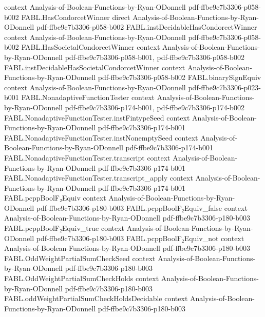 \begin{theorem}
  {context}
  {Analysis-of-Boolean-Functions-by-Ryan-ODonnell}
  {pdf-ffbe9c7b3306-p058-b002}
\proofstep
  {FABL.HasCondorcetWinner}
  {direct}
  {Analysis-of-Boolean-Functions-by-Ryan-ODonnell}
  {pdf-ffbe9c7b3306-p058-b002}
\proofstep
  {FABL.instDecidableHasCondorcetWinner}
  {context}
  {Analysis-of-Boolean-Functions-by-Ryan-ODonnell}
  {pdf-ffbe9c7b3306-p058-b002}
\proofstep
  {FABL.HasSocietalCondorcetWinner}
  {context}
  {Analysis-of-Boolean-Functions-by-Ryan-ODonnell}
  {pdf-ffbe9c7b3306-p058-b001,
    pdf-ffbe9c7b3306-p058-b002}
\proofstep
  {FABL.instDecidableHasSocietalCondorcetWinner}
  {context}
  {Analysis-of-Boolean-Functions-by-Ryan-ODonnell}
  {pdf-ffbe9c7b3306-p058-b002}
\proofstep
  {FABL.binarySignEquiv}
  {context}
  {Analysis-of-Boolean-Functions-by-Ryan-ODonnell}
  {pdf-ffbe9c7b3306-p023-b001}
\proofstep
  {FABL.NonadaptiveFunctionTester}
  {context}
  {Analysis-of-Boolean-Functions-by-Ryan-ODonnell}
  {pdf-ffbe9c7b3306-p174-b001,
    pdf-ffbe9c7b3306-p174-b002}
\proofstep
  {FABL.NonadaptiveFunctionTester.instFintypeSeed}
  {context}
  {Analysis-of-Boolean-Functions-by-Ryan-ODonnell}
  {pdf-ffbe9c7b3306-p174-b001}
\proofstep
  {FABL.NonadaptiveFunctionTester.instNonemptySeed}
  {context}
  {Analysis-of-Boolean-Functions-by-Ryan-ODonnell}
  {pdf-ffbe9c7b3306-p174-b001}
\proofstep
  {FABL.NonadaptiveFunctionTester.transcript}
  {context}
  {Analysis-of-Boolean-Functions-by-Ryan-ODonnell}
  {pdf-ffbe9c7b3306-p174-b001}
\proofstep
  {FABL.NonadaptiveFunctionTester.transcript_apply}
  {context}
  {Analysis-of-Boolean-Functions-by-Ryan-ODonnell}
  {pdf-ffbe9c7b3306-p174-b001}
\proofstep
  {FABL.pcppBoolF₂Equiv}
  {context}
  {Analysis-of-Boolean-Functions-by-Ryan-ODonnell}
  {pdf-ffbe9c7b3306-p180-b003}
\proofstep
  {FABL.pcppBoolF₂Equiv_false}
  {context}
  {Analysis-of-Boolean-Functions-by-Ryan-ODonnell}
  {pdf-ffbe9c7b3306-p180-b003}
\proofstep
  {FABL.pcppBoolF₂Equiv_true}
  {context}
  {Analysis-of-Boolean-Functions-by-Ryan-ODonnell}
  {pdf-ffbe9c7b3306-p180-b003}
\proofstep
  {FABL.pcppBoolF₂Equiv_not}
  {context}
  {Analysis-of-Boolean-Functions-by-Ryan-ODonnell}
  {pdf-ffbe9c7b3306-p180-b003}
\proofstep
  {FABL.OddWeightPartialSumCheckSeed}
  {context}
  {Analysis-of-Boolean-Functions-by-Ryan-ODonnell}
  {pdf-ffbe9c7b3306-p180-b003}
\proofstep
  {FABL.OddWeightPartialSumCheckHolds}
  {context}
  {Analysis-of-Boolean-Functions-by-Ryan-ODonnell}
  {pdf-ffbe9c7b3306-p180-b003}
\proofstep
  {FABL.oddWeightPartialSumCheckHoldsDecidable}
  {context}
  {Analysis-of-Boolean-Functions-by-Ryan-ODonnell}
  {pdf-ffbe9c7b3306-p180-b003}
\proofstep

\end{theorem}
